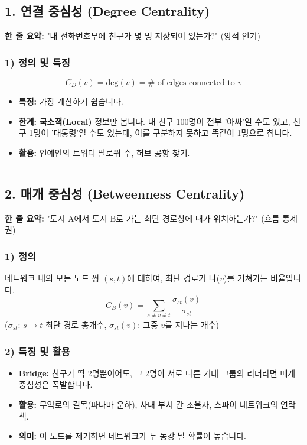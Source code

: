 \documentclass[11pt,a4paper]{book}
\theoremstyle{definition}
\begin{document}
\subsection{1. 연결 중심성 (Degree Centrality)}

\begin{conceptbox}[title={개념 1: 마당발 (The Popular Kid)}]
\textbf{한 줄 요약:} "내 전화번호부에 친구가 몇 명 저장되어 있는가?" (양적 인기)
\end{conceptbox}

\subsubsection*{1) 정의 및 특징}
$$ C_D(v) = \text{deg}(v) = \text{# of edges connected to } v $$
\begin{itemize}
    \item \textbf{특징:} 가장 계산하기 쉽습니다.
    \item \textbf{한계:} \textbf{국소적(Local)} 정보만 봅니다. 내 친구 100명이 전부 '아싸'일 수도 있고, 친구 1명이 '대통령'일 수도 있는데, 이를 구분하지 못하고 똑같이 1명으로 칩니다.
    \item \textbf{활용:} 연예인의 트위터 팔로워 수, 허브 공항 찾기.
\end{itemize}

\vspace{0.5cm}\hrule\vspace{0.5cm}

\subsection{2. 매개 중심성 (Betweenness Centrality)}


\begin{conceptbox}[title={개념 2: 문지기 (The Gatekeeper / Broker)}]
\textbf{한 줄 요약:} "도시 A에서 도시 B로 가는 최단 경로상에 내가 위치하는가?" (흐름 통제권)
\end{conceptbox}

\subsubsection*{1) 정의}
네트워크 내의 모든 노드 쌍 $(s, t)$에 대하여, 최단 경로가 나($v$)를 거쳐가는 비율입니다.
$$ C_B(v) = \sum_{s \neq v \neq t} \frac{\sigma_{st}(v)}{\sigma_{st}} $$
($\sigma_{st}$: $s \to t$ 최단 경로 총개수, $\sigma_{st}(v)$: 그중 $v$를 지나는 개수)

\subsubsection*{2) 특징 및 활용}
\begin{itemize}
    \item \textbf{Bridge:} 친구가 딱 2명뿐이어도, 그 2명이 서로 다른 거대 그룹의 리더라면 매개 중심성은 폭발합니다.
    \item \textbf{활용:} 무역로의 길목(파나마 운하), 사내 부서 간 조율자, 스파이 네트워크의 연락책.
    \item \textbf{의미:} 이 노드를 제거하면 네트워크가 두 동강 날 확률이 높습니다.
\end{itemize}
\end{document}
